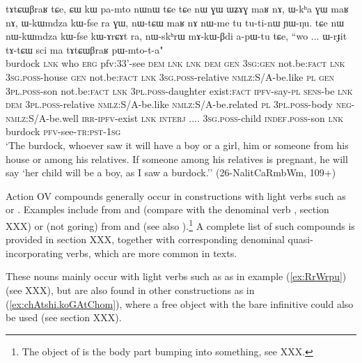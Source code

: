 \begin{exe}
\ex \label{ex:tAtCWBraR}
\gll tɤtɕɯβraʁ tɕe, ɕɯ kɯ pa-mto nɯnɯ tɕe tɕe nɯ ɣɯ ɯʑɤɣ maʁ nɤ, ɯ-kʰa ɣɯ maʁ nɤ,  ɯ-kɯmdza kɯ-fse ra ɣɯ, nɯ-tɕɯ maʁ nɤ nɯ-me tu tu-ti-nɯ ɲɯ-ŋu. tɕe nɯ nɯ-kɯmdza kɯ-fse kɯ-ɤrɕɤt ra, nɯ-skʰrɯ mɤ-kɯ-βdi a-pɯ-tu tɕe, ``wo ... ɯ-rɟit tɤ-tɕɯ sci ma tɤtɕɯβraʁ pɯ-mto-t-a" \\
burdock \textsc{lnk} who \textsc{erg}  pfv:3\fl{}3'-see \textsc{dem} \textsc{lnk} \textsc{lnk} \textsc{dem} \textsc{gen} \textsc{3sg:gen} not.be:\textsc{fact} \textsc{lnk} \textsc{3sg.poss}-house \textsc{gen} not.be:\textsc{fact} \textsc{lnk}  \textsc{3sg.poss}-relative \textsc{nmlz}:S/A-be.like \textsc{pl} \textsc{gen} \textsc{3pl.poss}-son not.be:\textsc{fact} \textsc{lnk} \textsc{3pl.poss}-daughter exist:\textsc{fact} \textsc{ipfv}-say-\textsc{pl} \textsc{sens}-be \textsc{lnk} \textsc{dem} \textsc{3pl.poss}-relative  \textsc{nmlz}:S/A-be.like  \textsc{nmlz}:S/A-be.related \textsc{pl}  \textsc{3pl.poss}-body  \textsc{neg}-\textsc{nmlz}:S/A-be.well \textsc{irr}-\textsc{ipfv}-exist \textsc{lnk} \textsc{interj} .... \textsc{3sg.poss}-child \textsc{indef.poss}-son \textsc{lnk} burdock \textsc{pfv}-see-\textsc{tr:pst}-\textsc{1sg} \\
\glt `The burdock, whoever saw it will have a boy or a girl, him or someone from his house or among his relatives. If someone among his relatives is pregnant, he will say `her child will be a boy, as I saw a burdock.'' (26-NalitCaRmbWm, 109+)
\end{exe}

Action OV compounds generally occur in constructions with light verbs such as  or . Examples include  from  and  (compare with the denominal verb  , section XXX) or  (not goring) from  and   (see also ).\footnote{The object of  is the body part bumping into something, see XXX.} A complete list of such compounds is provided in section XXX, together with corresponding denominal quasi-incorporating verbs, which are more common in texts. 

These nouns mainly occur with light verbs such as  as in example (\ref{ex:RrWrpu}) (see XXX), but are also found in other constructions as in (\ref{ex:chAtshi.koGAtChom}), where a free object  with the bare infinitive  could also be used (see section XXX).

